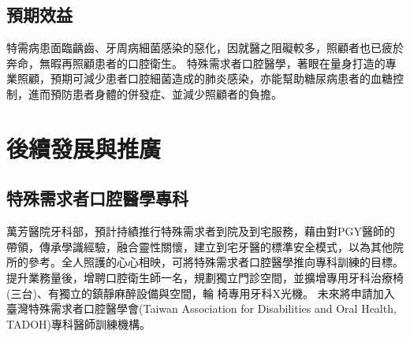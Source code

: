 \subsection{預期效益}
特需病患面臨齲齒、牙周病細菌感染的惡化，因就醫之阻礙較多，照顧者也已疲於奔命，無暇再照顧患者的口腔衛生。
特殊需求者口腔醫學，著眼在量身打造的專業照顧，預期可減少患者口腔細菌造成的肺炎感染，亦能幫助糖尿病患者的血糖控制，進而預防患者身體的併發症、並減少照顧者的負擔。


\section{後續發展與推廣}
\subsection*{特殊需求者口腔醫學專科}

萬芳醫院牙科部，預計持績推行特殊需求者到院及到宅服務，藉由對PGY醫師的帶領，傳承學識經驗，融合靈性關懷，建立到宅牙醫的標準安全模式，以為其他院所的參考。全人照護的心心相映，可將特殊需求者口腔醫學推向專科訓練的目標。
提升業務量後，增聘口腔衛生師一名，規劃獨立門診空間，並擴增專用牙科治療椅(三台)、有獨立的鎮靜麻醉設備與空間，輪 椅專用牙科X光機。
未來將申請加入臺灣特殊需求者口腔醫學會(Taiwan Association for Disabilities and Oral Health, TADOH)專科醫師訓練機構。








